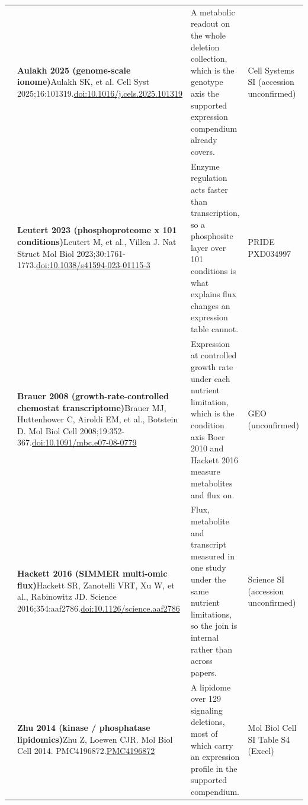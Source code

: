 \begin{landscape}
\begin{longtable}{@{}r@{\hspace{4pt}} L{86mm} L{92mm} L{62mm}@{}}
 & \textbf{Aulakh 2025 (genome-scale ionome)}\newline Aulakh SK, et al. Cell Syst 2025;16:101319.\newline \href{https://doi.org/10.1016/j.cels.2025.101319}{doi:10.1016/\allowbreak j.cels.2025.101319} & A metabolic readout on the whole deletion collection, which is the genotype axis the supported expression compendium already covers. & Cell Systems SI (accession unconfirmed) \\
 & \textbf{Leutert 2023 (phosphoproteome x 101 conditions)}\newline Leutert M, et al., Villen J. Nat Struct Mol Biol 2023;30:1761-1773.\newline \href{https://doi.org/10.1038/s41594-023-01115-3}{doi:10.1038/\allowbreak s41594-023-01115-3} & Enzyme regulation acts faster than transcription, so a phosphosite layer over 101 conditions is what explains flux changes an expression table cannot. & PRIDE PXD034997 \\
 & \textbf{Brauer 2008 (growth-rate-controlled chemostat transcriptome)}\newline Brauer MJ, Huttenhower C, Airoldi EM, et al., Botstein D. Mol Biol Cell 2008;19:352-367.\newline \href{https://doi.org/10.1091/mbc.e07-08-0779}{doi:10.1091/\allowbreak mbc.e07-08-0779} & Expression at controlled growth rate under each nutrient limitation, which is the condition axis Boer 2010 and Hackett 2016 measure metabolites and flux on. & GEO (unconfirmed) \\
 & \textbf{Hackett 2016 (SIMMER multi-omic flux)}\newline Hackett SR, Zanotelli VRT, Xu W, et al., Rabinowitz JD. Science 2016;354:aaf2786.\newline \href{https://doi.org/10.1126/science.aaf2786}{doi:10.1126/\allowbreak science.aaf2786} & Flux, metabolite and transcript measured in one study under the same nutrient limitations, so the join is internal rather than across papers. & Science SI (accession unconfirmed) \\
 & \textbf{Zhu 2014 (kinase / phosphatase lipidomics)}\newline Zhu Z, Loewen CJR. Mol Biol Cell 2014. PMC4196872.\newline \href{https://pmc.ncbi.nlm.nih.gov/articles/PMC4196872/}{PMC4196872} & A lipidome over 129 signaling deletions, most of which carry an expression profile in the supported compendium. & Mol Biol Cell SI Table S4 (Excel) \\

\end{longtable}
\end{landscape}
